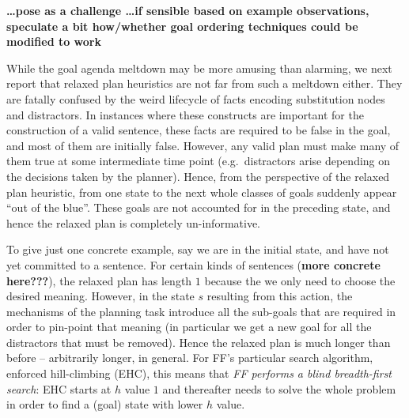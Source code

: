 {\bf \dots pose as a challenge \dots if sensible based on example
  observations, speculate a bit how/whether goal ordering techniques
  could be modified to work}











While the goal agenda meltdown may be more amusing than alarming, we
next report that relaxed plan heuristics are not far from such a
meltdown either. They are fatally confused by the weird lifecycle of
facts encoding substitution nodes and distractors. In instances where
these constructs are important for the construction of a valid
sentence, these facts are required to be false in the goal, and most
of them are initially false. However, any valid plan must make many of
them true at some intermediate time point (e.g.\ distractors arise
depending on the decisions taken by the planner). Hence, from the
perspective of the relaxed plan heuristic, from one state to the next
whole classes of goals suddenly appear ``out of the blue''. These
goals are not accounted for in the preceding state, and hence the
relaxed plan is completely un-informative.


To give just one concrete example, say we are in the initial state,
and have not yet committed to a sentence. For certain kinds of
sentences ({\bf more concrete here???}), the relaxed plan has length
$1$ because the we only need to choose the desired meaning. However,
in the state $s$ resulting from this action, the mechanisms of the
planning task introduce all the sub-goals that are required in order
to pin-point that meaning (in particular we get a new goal for all the
distractors that must be removed). Hence the relaxed plan is much
longer than before -- arbitrarily longer, in general. For FF's
particular search algorithm, enforced hill-climbing (EHC), this means
that {\em FF performs a blind breadth-first search}: EHC starts at $h$
value $1$ and thereafter needs to solve the whole problem in order to
find a (goal) state with lower $h$ value.

